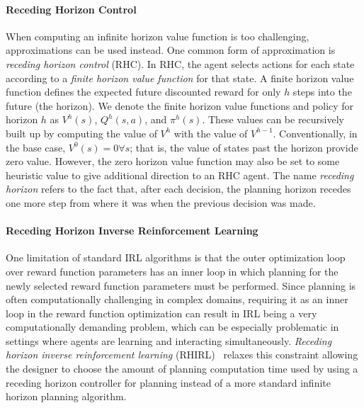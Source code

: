 
\paragraph{Receding Horizon Control}

When computing an infinite horizon value function is too challenging, approximations can be used instead. One common form of approximation is {\em receding horizon control} (RHC). In RHC, the agent selects actions for each state according to a {\em finite horizon value function} for that state. A finite horizon value function defines the expected future discounted reward for only $h$ steps into the future (the horizon). We denote the finite horizon value functions and policy for horizon $h$ as $V^h(s)$, $Q^h(s,a)$, and $\pi^h(s)$. These values can be recursively built up by computing the value of $V^h$ with the value of $V^{h-1}$. Conventionally, in the base case, $V^0(s) = 0 \forall s$; that is, the value of states past the horizon provide zero value. However, the zero horizon value function may also be set to some heuristic value to give additional direction to an RHC agent. The name {\em receding horizon} refers to the fact that, after each decision, the planning horizon recedes one more step from where it was when the previous decision was made.


\paragraph{Receding Horizon Inverse Reinforcement Learning}

One limitation of standard IRL algorithms is that the outer optimization loop over reward function parameters has an inner loop in which planning for the newly selected reward function parameters must be performed. Since planning is often computationally challenging in complex domains, requiring it as an inner loop in the reward function optimization can result in IRL being a very computationally demanding problem, which can be especially problematic in settings where agents are learning and interacting simultaneously. {\em Receding horizon inverse reinforcement learning} (RHIRL)~\cite{macglashan15b} relaxes this constraint allowing the designer to choose the amount of planning computation time used by using a receding horizon controller for planning instead of a more standard infinite horizon planning algorithm. %

